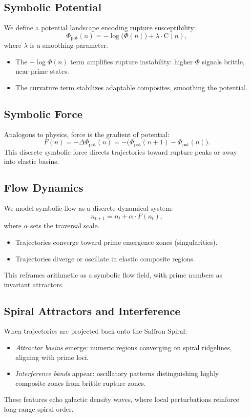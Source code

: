 \documentclass[11pt]{article}
\theoremstyle{plain}
\theoremstyle{definition}
\newcommand{\curv}{\mathrm{C}}                              %
\newcommand{\phidet}{\Phi}                                  %
\begin{document}
\subsection{Symbolic Potential}
We define a potential landscape encoding rupture susceptibility:
\[
\Phi_{\text{pot}}(n) = -\log\!\bigl(\phidet(n)\bigr) + \lambda \cdot \curv(n),
\]
where $\lambda$ is a smoothing parameter.  
\begin{itemize}
  \item The $-\log\!\phidet(n)$ term amplifies rupture instability: higher $\phidet$ signals brittle, near-prime states.  
  \item The curvature term stabilizes adaptable composites, smoothing the potential.  
\end{itemize}

\subsection{Symbolic Force}
Analogous to physics, force is the gradient of potential:
\[
F(n) = -\Delta \Phi_{\text{pot}}(n) = -\bigl(\Phi_{\text{pot}}(n+1) - \Phi_{\text{pot}}(n)\bigr).
\]
This discrete symbolic force directs trajectories toward rupture peaks or away into elastic basins.

\subsection{Flow Dynamics}
We model symbolic flow as a discrete dynamical system:
\[
n_{t+1} = n_t + \alpha \cdot F(n_t),
\]
where $\alpha$ sets the traversal scale.  
\begin{itemize}
  \item Trajectories converge toward prime emergence zones (singularities).  
  \item Trajectories diverge or oscillate in elastic composite regions.  
\end{itemize}
This reframes arithmetic as a symbolic flow field, with prime numbers as invariant attractors.

\subsection{Spiral Attractors and Interference}
When trajectories are projected back onto the Saffron Spiral:
\begin{itemize}
  \item \emph{Attractor basins} emerge: numeric regions converging on spiral ridgelines, aligning with prime loci.  
  \item \emph{Interference bands} appear: oscillatory patterns distinguishing highly composite zones from brittle rupture zones.  
\end{itemize}
These features echo galactic density waves, where local perturbations reinforce long-range spiral order.
\end{document}
